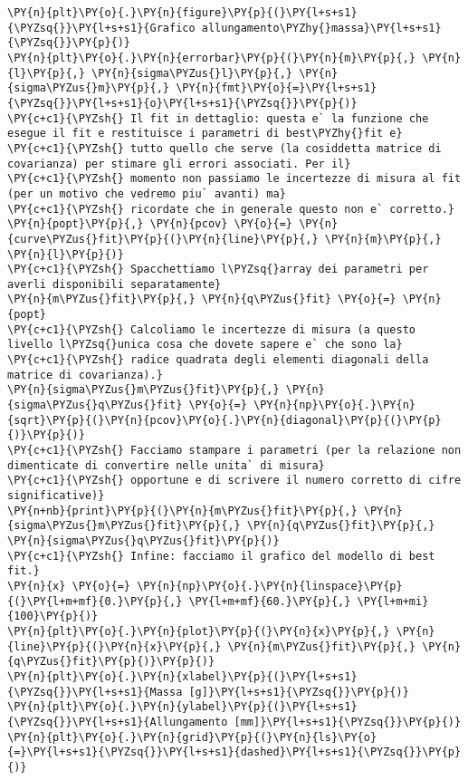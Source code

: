 \begin{Verbatim}[label=\makebox{\href{https://github.com/unipi-physics-labs/lab1-sheets/tree/main/snippy/misura_di_g.py}{https://github.com/.../misura\_di\_g.py}},commandchars=\\\{\}]
\PY{n}{plt}\PY{o}{.}\PY{n}{figure}\PY{p}{(}\PY{l+s+s1}{\PYZsq{}}\PY{l+s+s1}{Grafico allungamento\PYZhy{}massa}\PY{l+s+s1}{\PYZsq{}}\PY{p}{)}
\PY{n}{plt}\PY{o}{.}\PY{n}{errorbar}\PY{p}{(}\PY{n}{m}\PY{p}{,} \PY{n}{l}\PY{p}{,} \PY{n}{sigma\PYZus{}l}\PY{p}{,} \PY{n}{sigma\PYZus{}m}\PY{p}{,} \PY{n}{fmt}\PY{o}{=}\PY{l+s+s1}{\PYZsq{}}\PY{l+s+s1}{o}\PY{l+s+s1}{\PYZsq{}}\PY{p}{)}
\PY{c+c1}{\PYZsh{} Il fit in dettaglio: questa e` la funzione che esegue il fit e restituisce i parametri di best\PYZhy{}fit e}
\PY{c+c1}{\PYZsh{} tutto quello che serve (la cosiddetta matrice di covarianza) per stimare gli errori associati. Per il}
\PY{c+c1}{\PYZsh{} momento non passiamo le incertezze di misura al fit (per un motivo che vedremo piu` avanti) ma}
\PY{c+c1}{\PYZsh{} ricordate che in generale questo non e` corretto.}
\PY{n}{popt}\PY{p}{,} \PY{n}{pcov} \PY{o}{=} \PY{n}{curve\PYZus{}fit}\PY{p}{(}\PY{n}{line}\PY{p}{,} \PY{n}{m}\PY{p}{,} \PY{n}{l}\PY{p}{)}
\PY{c+c1}{\PYZsh{} Spacchettiamo l\PYZsq{}array dei parametri per averli disponibili separatamente}
\PY{n}{m\PYZus{}fit}\PY{p}{,} \PY{n}{q\PYZus{}fit} \PY{o}{=} \PY{n}{popt}
\PY{c+c1}{\PYZsh{} Calcoliamo le incertezze di misura (a questo livello l\PYZsq{}unica cosa che dovete sapere e` che sono la}
\PY{c+c1}{\PYZsh{} radice quadrata degli elementi diagonali della matrice di covarianza).}
\PY{n}{sigma\PYZus{}m\PYZus{}fit}\PY{p}{,} \PY{n}{sigma\PYZus{}q\PYZus{}fit} \PY{o}{=} \PY{n}{np}\PY{o}{.}\PY{n}{sqrt}\PY{p}{(}\PY{n}{pcov}\PY{o}{.}\PY{n}{diagonal}\PY{p}{(}\PY{p}{)}\PY{p}{)}
\PY{c+c1}{\PYZsh{} Facciamo stampare i parametri (per la relazione non dimenticate di convertire nelle unita` di misura}
\PY{c+c1}{\PYZsh{} opportune e di scrivere il numero corretto di cifre significative)}
\PY{n+nb}{print}\PY{p}{(}\PY{n}{m\PYZus{}fit}\PY{p}{,} \PY{n}{sigma\PYZus{}m\PYZus{}fit}\PY{p}{,} \PY{n}{q\PYZus{}fit}\PY{p}{,} \PY{n}{sigma\PYZus{}q\PYZus{}fit}\PY{p}{)}
\PY{c+c1}{\PYZsh{} Infine: facciamo il grafico del modello di best fit.}
\PY{n}{x} \PY{o}{=} \PY{n}{np}\PY{o}{.}\PY{n}{linspace}\PY{p}{(}\PY{l+m+mf}{0.}\PY{p}{,} \PY{l+m+mf}{60.}\PY{p}{,} \PY{l+m+mi}{100}\PY{p}{)}
\PY{n}{plt}\PY{o}{.}\PY{n}{plot}\PY{p}{(}\PY{n}{x}\PY{p}{,} \PY{n}{line}\PY{p}{(}\PY{n}{x}\PY{p}{,} \PY{n}{m\PYZus{}fit}\PY{p}{,} \PY{n}{q\PYZus{}fit}\PY{p}{)}\PY{p}{)}
\PY{n}{plt}\PY{o}{.}\PY{n}{xlabel}\PY{p}{(}\PY{l+s+s1}{\PYZsq{}}\PY{l+s+s1}{Massa [g]}\PY{l+s+s1}{\PYZsq{}}\PY{p}{)}
\PY{n}{plt}\PY{o}{.}\PY{n}{ylabel}\PY{p}{(}\PY{l+s+s1}{\PYZsq{}}\PY{l+s+s1}{Allungamento [mm]}\PY{l+s+s1}{\PYZsq{}}\PY{p}{)}
\PY{n}{plt}\PY{o}{.}\PY{n}{grid}\PY{p}{(}\PY{n}{ls}\PY{o}{=}\PY{l+s+s1}{\PYZsq{}}\PY{l+s+s1}{dashed}\PY{l+s+s1}{\PYZsq{}}\PY{p}{)}


\end{Verbatim}

